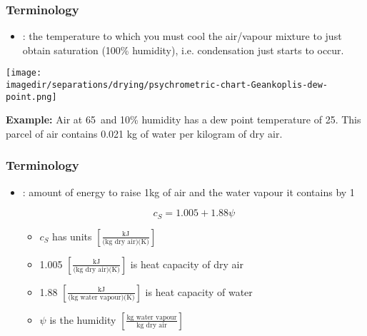 \begin{frame}\frametitle{Terminology}
	\begin{itemize}
		\item	{\color{purple}{Dew point}}: the temperature to which you must cool the air/vapour mixture to just obtain saturation (100\% humidity), i.e. condensation just starts to occur.
	\end{itemize}
	
	\begin{center}
		\texttt{[image: \\imagedir/separations/drying/psychrometric-chart-Geankoplis-dew-point.png]}
	\end{center}
	
	\textbf{Example:} Air at 65\degC$\,$ and 10\% humidity has a dew point temperature of 25\degC. This parcel of air contains 0.021 kg of water per kilogram of dry air.
\end{frame}

\begin{frame}\frametitle{Terminology}
	\begin{itemize}
		\item	 {\color{purple}{Humid heat}}: amount of energy to raise 1kg of air and the water vapour it contains by 1\degC
		
		\begin{exampleblock}{}
			\[c_S = 1.005 + 1.88\psi\]
		\end{exampleblock}
		\begin{itemize}
			\item	$c_S$ has units $\left[\displaystyle \frac{\text{kJ}}{\text{(kg dry air)(K)}} \right]$
			\item	1.005 $\left[\displaystyle \frac{\text{kJ}}{\text{(kg dry air)(K)}} \right]$ is heat capacity of dry air
			\item	1.88 $\left[\displaystyle \frac{\text{kJ}}{\text{(kg water vapour)(K)}} \right]$ is heat capacity of water {}  %
			\item	$\psi$ is the humidity $ \left[ \displaystyle \frac{\text{kg water vapour}}{\text{kg dry air}}\right]$ 
		\end{itemize}
	\end{itemize}
\end{frame}

